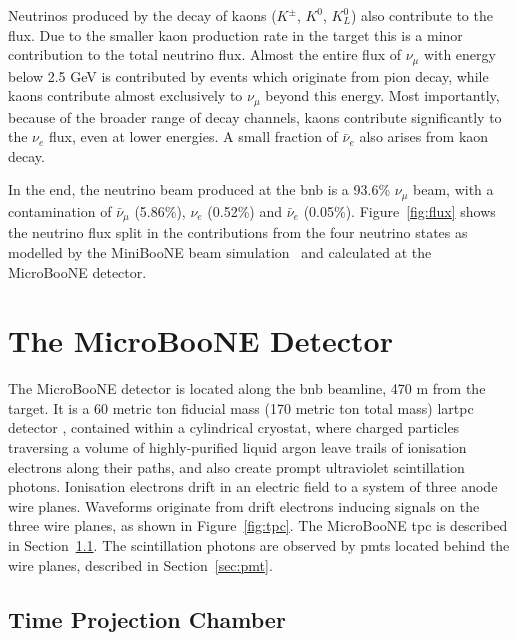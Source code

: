 Neutrinos produced by the decay of kaons ($K^\pm$, $K^0$, $K_L^0$) also contribute to the flux. Due to the smaller kaon production rate in the target this is a minor contribution to the total neutrino flux. Almost the entire flux of $\nu_\mu$ with  energy below 2.5 GeV is contributed by events which originate from pion decay, while kaons contribute almost exclusively to $\nu_\mu$ beyond this energy. Most importantly, because of the broader range of decay channels, kaons contribute significantly to the $\nu_e$ flux, even at lower energies. A small fraction of $\bar{\nu}_e$ also arises from kaon decay.

In the end, the neutrino beam produced at the \acrshort{bnb} is a 93.6\% $\nu_\mu$ beam, with a contamination of $\bar{\nu}_\mu$ (5.86\%), $\nu_e$ (0.52\%) and $\bar{\nu}_e$ (0.05\%). Figure~\ref{fig:flux} shows the neutrino flux split in the contributions from the four neutrino states as modelled by the MiniBooNE beam simulation~\cite{miniboone_flux} and calculated at the MicroBooNE detector.

\section{The MicroBooNE Detector}
\label{sec:detector}

The MicroBooNE detector is located along the \acrshort{bnb} beamline, 470 m from the target.
It is a 60 metric ton fiducial mass (170 metric ton total mass) \acrshort{lartpc} detector \cite{det}, contained within a cylindrical cryostat, where charged particles traversing a volume of highly-purified liquid argon leave trails of ionisation electrons along their paths, and also create prompt ultraviolet scintillation photons. Ionisation electrons drift in an electric field to a system of three anode wire planes. Waveforms originate from drift electrons inducing signals on the three wire planes, as shown in Figure~\ref{fig:tpc}. The MicroBooNE \acrfull{tpc} is described in Section~\ref{sec:tpc}.
The scintillation photons are observed by \acrshort{pmt}s located behind the wire planes, described in Section~\ref{sec:pmt}.




\subsection{Time Projection Chamber}
\label{sec:tpc}

